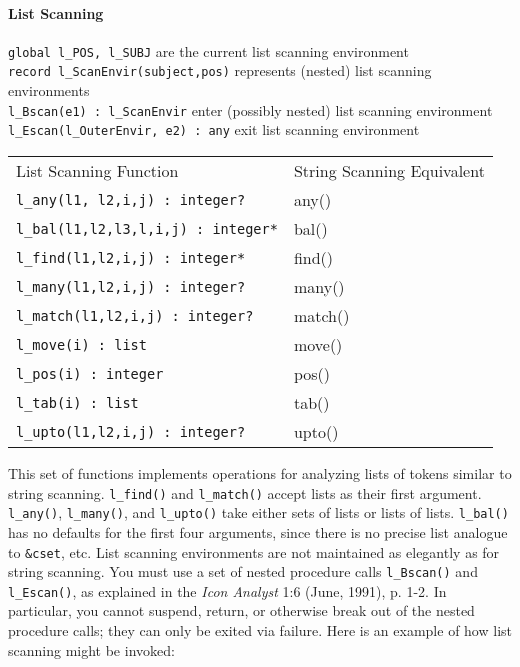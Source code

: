 \paragraph{List Scanning}
\texttt{global l\_POS, l\_SUBJ} are the current list scanning
environment\\
\texttt{record l\_ScanEnvir(subject,pos)} represents (nested) list
scanning environments\\
\texttt{l\_Bscan(e1) : l\_ScanEnvir} enter (possibly nested) list
scanning environment\\
\texttt{l\_Escan(l\_OuterEnvir, e2) : any} exit list scanning
environment

\begin{xtabular}{m{3in} m{2in}}
List Scanning Function & String Scanning Equivalent \\

\texttt{l\_any(l1, l2,i,j) : integer?} & any()\\
\texttt{l\_bal(l1,l2,l3,l,i,j) : integer*} & bal()\\
\texttt{l\_find(l1,l2,i,j) : integer*} & find()\\
\texttt{l\_many(l1,l2,i,j) : integer?} &  many()\\
\texttt{l\_match(l1,l2,i,j) : integer?} &  match()\\
\texttt{l\_move(i) : list} & move()\\
\texttt{l\_pos(i) : integer} & pos()\\
\texttt{l\_tab(i) : list} & tab()\\
\texttt{l\_upto(l1,l2,i,j) : integer?} & upto()\\
\end{xtabular}

This set of functions implements operations for analyzing lists of
tokens similar to string scanning. \texttt{l\_find()} and
\texttt{l\_match()} accept lists as their first argument.
\texttt{l\_any()}, \texttt{l\_many()}, and \texttt{l\_upto()} take
either sets of lists or lists of lists. \texttt{l\_bal()} has no
defaults for the first four arguments, since there is no precise list
analogue to \texttt{\&cset}, etc. List scanning environments are not
maintained as elegantly as for string scanning. You must use a set of
nested procedure calls \texttt{l\_Bscan()} and \texttt{l\_Escan()}, as
explained in the \textit{Icon Analyst} 1:6 (June, 1991), p. 1-2. In
particular, you cannot suspend, return, or otherwise break out of the
nested procedure calls; they can only be exited via failure. Here is an
example of how list scanning might be invoked:


